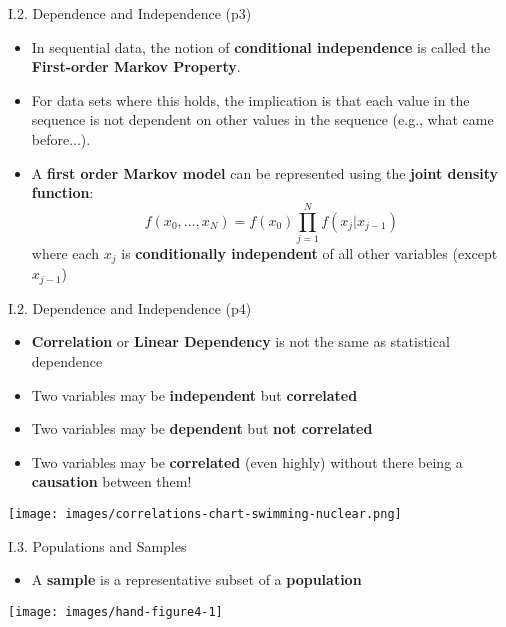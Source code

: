 \documentclass[handout]{beamer}
\newcommand{\strong}[1]{\textbf{\color{teal} #1}}
\newcommand{\stronger}[1]{\textbf{\color{purple} #1}}
\begin{document}
\begin{frame}{I.2. Dependence and Independence (p3)}
\begin{itemize}
\item In sequential data, the notion of \strong{conditional independence} is called
the \stronger{First-order Markov Property}.
\item For data sets where this holds, the implication is that each value in the sequence is not dependent on other values in the sequence (e.g., what came before...).
\item A \stronger{first order Markov model} can be represented using the \stronger{joint density function}:
\[
f(x_0,\ldots,x_N) = f(x_0)\prod_{j=1}^N{f(x_j|x_{j-1})}
\]
where each $x_j$ is \strong{conditionally independent} of all other variables (except $x_{j-1}$)
\end{itemize}
\end{frame}
\begin{frame}{I.2. Dependence and Independence (p4)}
\begin{itemize}
\item \stronger{Correlation} or \strong{Linear Dependency} is not the same as statistical dependence
\item Two variables may be \strong{independent} but \strong{correlated}
\item Two variables may be \strong{dependent} but \strong{not correlated}
\item Two variables may be \strong{correlated} (even highly) without there being a \strong{causation} between them!
\end{itemize}
\begin{center}
\texttt{[image: images/correlations-chart-swimming-nuclear.png]}
\end{center}
\end{frame}
\begin{frame}{I.3. Populations and Samples}
\begin{itemize}
\item A \stronger{sample} is a representative subset of a \stronger{population}
\end{itemize}
\begin{center}
\texttt{[image: images/hand-figure4-1]}\\
\cite[Figure 4.1]{hand-et-al:2001}
\end{center}
\end{frame}
\end{document}
